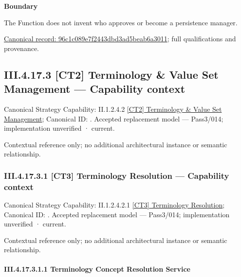 \textbf{Boundary}



The Function does not invent who approves or become a persistence manager.


{\footnotesize \href{../../../../../../../../continuum/business/business-function/96c1c089e7f2443dbd3ad5beab6a3011.md}{Canonical record: 96c1c089e7f2443dbd3ad5beab6a3011}; full qualifications and provenance.}\par
\subsection*{III.4.17.3 [CT2] Terminology \& Value Set Management — Capability context}
\label{navigation:III.4.17.3}

{\small Canonical Strategy Capability: II.1.2.4.2 \hyperref[element:206b3d64a5b14e9a99974851c8be45df]{[CT2] Terminology \& Value Set Management}; Canonical ID: \texttt{}. Accepted replacement model — Pass3/014; implementation unverified · current.}\par
Contextual reference only; no additional architectural instance or semantic relationship.\par
\subsubsection*{III.4.17.3.1 [CT3] Terminology Resolution — Capability context}
\label{navigation:III.4.17.3.1}

{\small Canonical Strategy Capability: II.1.2.4.2.1 \hyperref[element:aaca8daf33a242b19a748be71003fb2c]{[CT3] Terminology Resolution}; Canonical ID: \texttt{}. Accepted replacement model — Pass3/014; implementation unverified · current.}\par
Contextual reference only; no additional architectural instance or semantic relationship.\par
\paragraph*{III.4.17.3.1.1 Terminology Concept Resolution Service}
\label{navigation:III.4.17.3.1.1}

